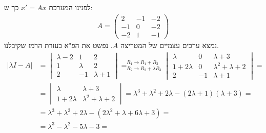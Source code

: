 \documentclass{article}
\DeclareMathOperator*{\equals}{=}
\begin{document}
לפנינו המערכת $x'=Ax$ כך ש:
\begin{align*}
    A=\begin{pmatrix}
          2  & -1 & -2 \\
          -1 & 0  & -2 \\
          -2 & 1  & -1
      \end{pmatrix}
\end{align*}
נמצא ערכים עצמיים של המטריצה $A$. נפשט את הפ"א בעזרת הרמז שקיבלנו.
\begin{align*}
    |\lambda I -A| & =\begin{vmatrix}
                          \lambda-2 & 1       & 2         \\
                          1         & \lambda & 2         \\
                          2         & -1      & \lambda+1
                      \end{vmatrix}\equals^{R_1\rightarrow R_1+R_3}_{R_2\rightarrow R_2+\lambda R_3} \begin{vmatrix}
                                                                                                         \lambda    & 0  & \lambda+3           \\
                                                                                                         1+2\lambda & 0  & \lambda^2+\lambda+2 \\
                                                                                                         2          & -1 & \lambda+1
                                                                                                     \end{vmatrix} = \\
                   & = \begin{vmatrix}
                           \lambda    & \lambda+3           \\
                           1+2\lambda & \lambda^2+\lambda+2
                       \end{vmatrix} = \lambda^3+\lambda^2+2\lambda - (2\lambda+1)(\lambda+3) =                                            \\
                   & = \lambda^3+\lambda^2+2\lambda - (2\lambda^2+\lambda+6\lambda+3)=                                                     \\
                   & = \lambda^3-\lambda^2-5\lambda-3 =                                                                                    \\

\end{align*}
\end{document}
